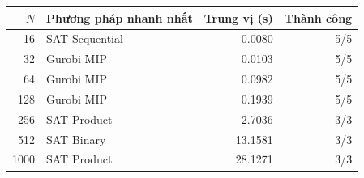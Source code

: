 \begin{tabular}{rlrr}
\toprule
$N$ & Phương pháp nhanh nhất & Trung vị (s) & Thành công \\
\midrule
16 & SAT Sequential & 0.0080 & 5/5 \\
32 & Gurobi MIP & 0.0103 & 5/5 \\
64 & Gurobi MIP & 0.0982 & 5/5 \\
128 & Gurobi MIP & 0.1939 & 5/5 \\
256 & SAT Product & 2.7036 & 3/3 \\
512 & SAT Binary & 13.1581 & 3/3 \\
1000 & SAT Product & 28.1271 & 3/3 \\
\bottomrule
\end{tabular}
